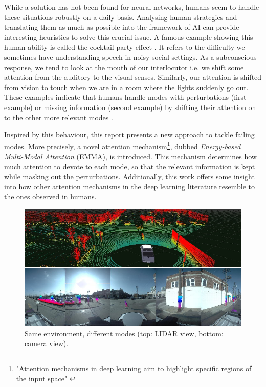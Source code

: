 While a solution has not been found for neural networks, humans seem to handle these situations robustly on a daily basis. Analysing human strategies and translating them as much as possible into the framework of AI can provide interesting heuristics to solve this crucial issue. A famous example showing this human ability is called the cocktail-party effect \citep{cocktail-party}. It refers to the difficulty we sometimes have understanding speech in noisy social settings. As a subconscious response, we tend to look at the mouth of our interlocutor i.e. we shift some attention from the auditory to the visual senses. Similarly, our attention is shifted from vision to touch when we are in a room where the lights suddenly go out. These examples indicate that humans handle modes with perturbations (first example) or missing information (second example) by shifting their attention on to the other more relevant modes \citep{crossmodal}.

Inspired by this behaviour, this report presents a new approach to tackle failing modes. More precisely, a novel attention mechanism\footnote{"Attention mechanisms in deep learning aim to highlight specific regions of the input space" \citep{attentive-survey}}, dubbed \textit{Energy-based Multi-Modal Attention} (EMMA), is introduced. This mechanism determines how much attention to devote to each mode, so that the relevant information is kept while masking out the perturbations. Additionally, this work offers some insight into how other attention mechanisms in the deep learning literature resemble to the ones observed in humans.

\begin{figure}[!ht]
\centering
\includegraphics[scale=0.55]{figures/lidar-camera}
\caption[Lidar \& Camera view in self-driving cars]{Same environment, different modes (top: LIDAR view, bottom: camera view).}	
\label{fig:lidar-camera}
\end{figure}


